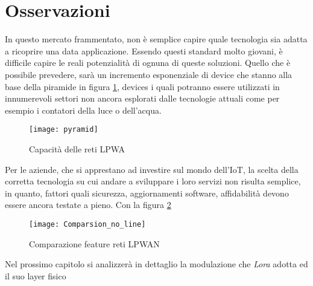 \section{Osservazioni}
In questo mercato frammentato, non è semplice capire quale tecnologia sia adatta
a ricoprire una data applicazione. Essendo questi standard molto giovani, è
difficile capire le reali potenzialità di ognuna di queste soluzioni.
Quello che è possibile prevedere, sarà un incremento esponenziale di device che
stanno alla base della piramide in figura \ref{fig:pyramid}, devices i quali
potranno essere utilizzati in innumerevoli settori non ancora esplorati dalle
tecnologie attuali come per esempio i contatori della luce o dell'acqua. 
\begin{figure}[h]
    \centering 
                \texttt{[image: pyramid]}
    \caption{Capacità delle reti LPWA}
    \label{fig:pyramid} 
\end{figure}
Per le aziende, che si apprestano ad investire sul mondo dell'IoT, la scelta
della corretta tecnologia su cui andare a sviluppare i loro servizi non risulta
semplice, in quanto, fattori quali sicurezza, aggiornamenti software,
affidabilità devono essere ancora testate a pieno. Con la figura
\ref{fig:feature_comp}
\begin{figure}[h]
    \centering 
                \texttt{[image: Comparsion\_no\_line]}
    \caption{Comparazione feature reti LPWAN}
    \label{fig:feature_comp} 
\end{figure}
Nel prossimo capitolo si analizzerà in dettaglio la modulazione che \emph{Lora}
adotta ed il suo layer fisico
